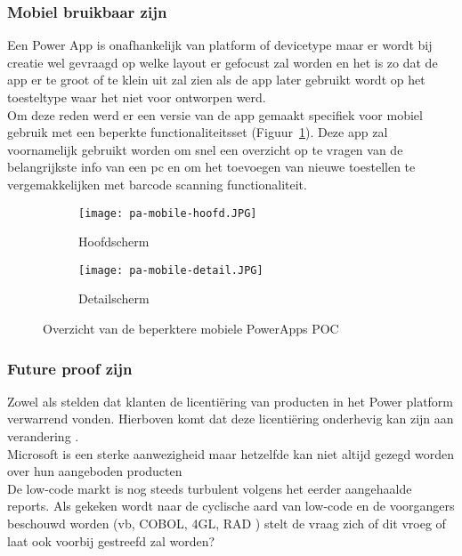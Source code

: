 \subsubsection{Mobiel bruikbaar zijn}

Een Power App is onafhankelijk van platform of devicetype maar er wordt bij creatie wel gevraagd op welke layout er gefocust zal worden en het is zo dat de app er te groot of te klein uit zal zien als de app later gebruikt wordt op het toesteltype waar het niet voor ontworpen werd.\\
Om deze reden werd er een versie van de app gemaakt specifiek voor mobiel gebruik met een beperkte functionaliteitsset (Figuur~\ref{fig:pa-mobile}). Deze app zal voornamelijk gebruikt worden om snel een overzicht op te vragen van de belangrijkste info van een pc en om het toevoegen van nieuwe toestellen te vergemakkelijken met barcode scanning functionaliteit.

\begin{figure}[h!]
    \centering
    \begin{subfigure}[b]{0.45\linewidth}
        \texttt{[image: pa-mobile-hoofd.JPG]}
        \caption{Hoofdscherm}
    \end{subfigure}
    \begin{subfigure}[b]{0.45\linewidth}
        \texttt{[image: pa-mobile-detail.JPG]}
        \caption{Detailscherm}
    \end{subfigure}
    \caption{Overzicht van de beperktere mobiele PowerApps POC}
    \label{fig:pa-mobile}
\end{figure}

\subsubsection{Future proof zijn}

Zowel \textcite{Rymer2019} als \textcite{Vincent2019} stelden dat klanten de licentiëring van producten in het Power platform verwarrend vonden. Hierboven komt dat deze licentiëring onderhevig kan zijn aan verandering \autocite{Pohl2019}.\\
Microsoft is een sterke aanwezigheid maar hetzelfde kan niet altijd gezegd worden over hun aangeboden producten \autocite{Bott2018}\\
De low-code markt is nog steeds turbulent volgens het eerder aangehaalde reports.
Als gekeken wordt naar de cyclische aard van low-code en de voorgangers beschouwd worden (vb, COBOL, 4GL, RAD ) stelt de vraag zich of dit vroeg of laat ook voorbij gestreefd zal worden? \autocite{Reselman2018}

